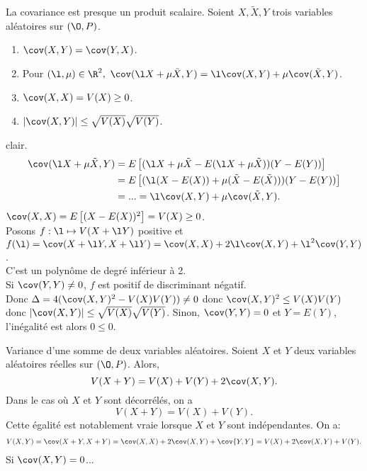 \documentclass[11pt]{article}
\begin{document}
\begin{lemme}{La covariance est presque un produit scalaire.}{}
    Soient $X,\tilde{X}, Y$ trois variables aléatoires sur $(\O,P)$.
    \begin{enumerate}[topsep=0pt,itemsep=-0.5 ex]
        \item $\cov(X,Y)=\cov(Y,X)$.
        \item Pour $(\l,\mu)\in\R^2,~\cov(\l X + \mu \tilde{X}, Y)=\l\cov(X,Y)+\mu\cov(\tilde{X},Y)$.
        \item $\cov(X,X)=V(X)\geq0$.
        \item $|\cov(X,Y)|\leq\sqrt{V(X)}\sqrt{V(Y)}$.
    \end{enumerate}
    \tcblower
     clair.\\
    \begin{align*} 
        \cov(\l X + \mu \tilde{X}, Y)&=E\left[ (\l X + \mu \tilde{X} - E(\l X + \mu \tilde{X}))(Y - E(Y)) \right]\\
        &=E\left[ (\l(X-E(X))+\mu(\tilde{X}-E(\tilde{X})))(Y-E(Y)) \right]\\
        &=...=\l\cov(X,Y)+\mu\cov(\tilde{X},Y).
    \end{align*}
     $\cov(X,X)=E\left[(X-E(X))^2\right]=V(X)\geq0$.\\
     Posons $f:\l\mapsto V(X+\l Y)$ positive et $f(\l)=\cov(X+\l Y, X+\l Y)=\cov(X,X)+2\l\cov(X,Y)+\l^2\cov(Y,Y)$.\\
    C'est un polynôme de degré inférieur à 2.\\
    Si $\cov(Y,Y)\neq0$, $f$ est positif de discriminant négatif.\\
    Donc $\Delta=4(\cov(X,Y)^2-V(X)V(Y))\neq0$ donc $\cov(X,Y)^2\leq V(X)V(Y)$ donc $|\cov(X,Y)|\leq\sqrt{V(X)}\sqrt{V(Y)}$.\n
    Sinon, $\cov(Y,Y)=0$ et $Y=E(Y)$, l'inégalité est alors $0\leq0$.
\end{lemme}

\begin{prop}{Variance d'une somme de deux variables aléatoires.}{}
    Soient $X$ et $Y$ deux variables aléatoires réelles sur $(\O,P)$. Alors,
    \begin{equation*}
        V(X+Y)=V(X)+V(Y)+2\cov(X,Y).
    \end{equation*}
    Dans le cas où $X$ et $Y$ sont décorrélés, on a
    \begin{equation*}
        V(X+Y)=V(X)+V(Y).
    \end{equation*}
    Cette égalité est notablement vraie lorsque $X$ et $Y$ sont indépendantes.
    \tcblower
    On a:
    \begin{align*}
        V(X,Y)=\cov(X+Y, X+Y)=\cov(X,X)+2\cov(X,Y)+\cov{Y,Y}=V(X)+2\cov(X,Y)+V(Y).
    \end{align*}
    Si $\cov(X,Y)=0$...
\end{prop}
\end{document}
